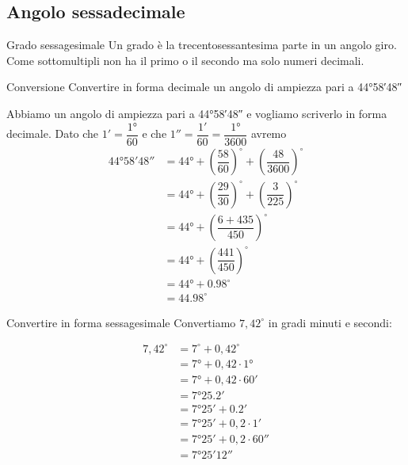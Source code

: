 \subsection{Angolo sessadecimale}
\begin{definizionet}{Grado sessagesimale}{}
	Un grado è la trecentosessantesima parte in un angolo giro. Come sottomultipli non ha il primo o il secondo ma solo numeri decimali.
\end{definizionet}
\begin{esempiot}{Conversione}{}
Convertire in forma decimale un angolo di ampiezza pari a \ang{44;58;48}
\end{esempiot}
 Abbiamo un angolo di ampiezza pari a \ang{44;58;48} e vogliamo
 scriverlo in forma decimale. Dato che $\ang{;1;}=\dfrac{\ang{1}}{60}$ e che $\ang{;;1}=\dfrac{\ang{;1;}}{60}=\dfrac{\ang{1}}{3600}$ avremo
\begin{align*}
	\ang{44;58;48}&=\ang{44}+\left(\dfrac{58}{60}\right)^{\circ}+\left(\dfrac{48}{3600} \right)^{\circ}\\
	&=\ang{44}+\left(\dfrac{29}{30}\right)^{\circ}+\left(\dfrac{3}{225} \right)^{\circ}\\
	&=\ang{44}+\left(\dfrac{6+435}{450} \right)^{\circ}\\
	&=\ang{44}+\left(\dfrac{441}{450} \right)^{\circ}\\
	&=\ang{44}+\num{0,98}^{\circ}\\
	&=\num{44,98}^{\circ}
\end{align*}
\begin{esempiot}{Convertire in forma sessagesimale}{}
Convertiamo $7,42^{\circ}$ in gradi minuti e secondi:
\end{esempiot}
\begin{align*}
	7,42^{\circ}&=7^{\circ}+0,42^{\circ}\\
	&=\ang{7}+0,42\cdot \ang{1}\\
	&=\ang{7}+0,42\cdot \ang{;60;}\\
	&=\ang{7;25,2;}\\
	&=\ang{7;25;}+\ang{;0,2;}\\
	&=\ang{7;25;}+0,2\cdot\ang{;1;}\\
	&=\ang{7;25;}+0,2\cdot\ang{;;60}\\
	&=\ang{7;25;12}
\end{align*} 

